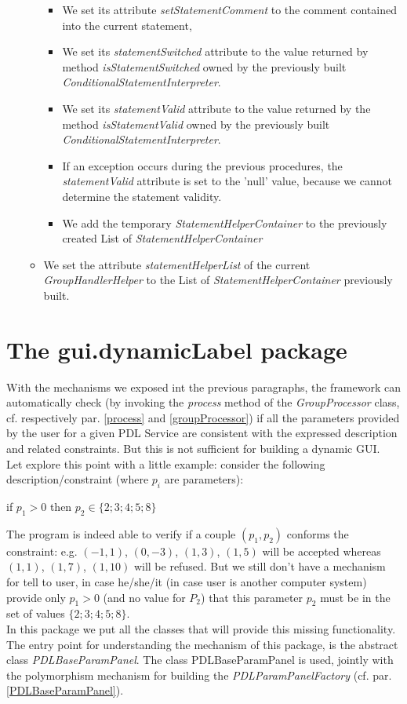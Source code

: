 \documentclass[a4paper,11pt] {ivoa}
\begin{document}
\begin{itemize}
\begin{itemize}
\begin{itemize}
\item We set its attribute {\it setStatementComment} to the comment contained into the current statement, 
\item We set its {\it statementSwitched} attribute to the value returned by method {\it isStatementSwitched} owned by the previously built {\it ConditionalStatementInterpreter}. \item We set its {\it statementValid} attribute to the value returned by the method {\it isStatementValid} owned by the previously built {\it ConditionalStatementInterpreter}. 
\item If an exception occurs during the previous procedures, the {\it statementValid} attribute is set to the 'null' value, because we cannot determine the statement validity.
\item We add the temporary  {\it StatementHelperContainer} to the previously created List of {\it StatementHelperContainer}
\end{itemize}  
\item We set the attribute {\it statementHelperList} of the current {\it GroupHandlerHelper} to the List of {\it StatementHelperContainer} previously built.
\end{itemize}
\end{itemize}

\section{The gui.dynamicLabel package}
With the mechanisms we exposed int the previous paragraphs, the framework can automatically check (by invoking the {\it process} method of the {\it GroupProcessor} class, cf. respectively  par.  \ref{process} and \ref{groupProcessor}) if all the parameters provided by the user for a given PDL Service are consistent with the expressed description and related constraints. But this is not sufficient for building a dynamic GUI.\\
Let explore this point with a little example: consider the following description/constraint (where $p_i$ are parameters):\\
\begin{center}
if $p_1>0$ then $p_2 \in \{2; 3; 4; 5; 8\}$
\end{center}
The program is indeed able to verify if a couple $(p_1,p_2)$ conforms the constraint: e.g. $(-1,1)$, $(0,-3)$, $(1,3)$, $(1,5)$ will be accepted whereas $(1,1)$, $(1,7)$, $(1,10)$ will be refused. But we still don't have a mechanism for tell to user, in case he/she/it (in case user is another computer system) provide only $p_1>0$ (and no value for $P_2$) that this parameter $p_2$  must be in the set of values $\{2; 3; 4; 5; 8\}$.\\
In this package we put all the classes that will provide this missing functionality.\\
The entry point for understanding the mechanism of this package, is the abstract class {\it PDLBaseParamPanel}.
The class PDLBaseParamPanel is used, jointly with the polymorphism mechanism for building the {\it PDLParamPanelFactory} (cf. par. \ref{PDLBaseParamPanel}).
\end{document}
